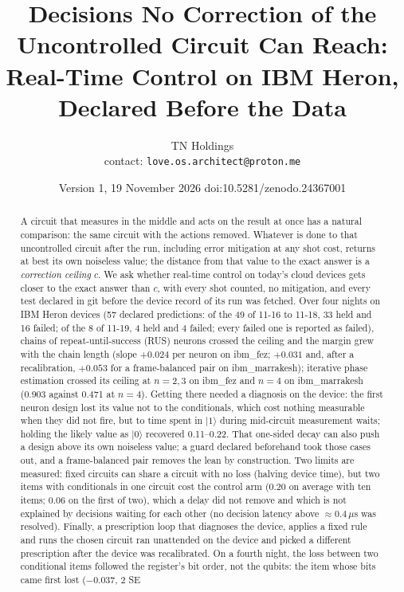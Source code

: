 \documentclass[10pt,a4paper]{article}
\title{Decisions No Correction of the Uncontrolled Circuit Can Reach:\\ Real-Time Control on IBM Heron, Declared
Before the Data}
\author{TN Holdings\\ \small contact: \texttt{love.os.architect@proton.me}}
\date{Version 1, 19 November 2026 \quad doi:10.5281/zenodo.24367001}
\begin{document}
\maketitle

\begin{abstract}
A circuit that measures in the middle and acts on the result at once has a natural comparison: the same circuit with
the actions removed. Whatever is done to that uncontrolled circuit after the run, including error mitigation at any
shot cost, returns at best its own noiseless value; the distance from that value to the exact answer is a
\emph{correction ceiling} $c$. We ask whether real-time control on today's cloud devices gets closer to the exact answer
than $c$, with every shot counted, no mitigation, and every test declared in git before the device record of its run
was fetched. Over four nights on IBM Heron devices (57 declared predictions: of the 49 of 11-16 to 11-18, 33 held and
16 failed; of the 8 of 11-19, 4 held and 4 failed; every failed one is reported as failed), chains of repeat-until-success (RUS) neurons crossed the ceiling and the margin grew with the chain length
(slope $+0.024$ per neuron on ibm\_fez; $+0.031$ and, after a recalibration, $+0.053$ for a frame-balanced pair on
ibm\_marrakesh); iterative phase estimation crossed its ceiling at $n=2,3$ on ibm\_fez and $n=4$ on ibm\_marrakesh
(0.903 against 0.471 at $n=4$). Getting
there needed a diagnosis on the device: the first neuron design lost its value not to the conditionals, which cost
nothing measurable when they did not fire, but to time spent in $|1\rangle$ during mid-circuit measurement waits;
holding the likely value as $|0\rangle$ recovered 0.11--0.22. That one-sided decay can also push a design above its own
noiseless value; a guard declared beforehand took those cases out, and a frame-balanced pair removes the lean by
construction. Two limits are measured: fixed circuits can share a circuit with no loss (halving device time), but two
items with conditionals in one circuit cost the control arm (0.20 on average with ten items; 0.06 on the first of two),
which a delay did not remove and which is not explained by decisions waiting for each other (no decision latency above $\approx0.4\,\mu$s was resolved). Finally, a
prescription loop that diagnoses the device, applies a fixed rule and runs the chosen circuit ran unattended on the
device and picked a different prescription after the device was recalibrated. On a fourth night, the loss between two
conditional items followed the register's bit order, not the qubits: the item whose bits came first lost ($-0.037$, 2 SE

\end{abstract}
\end{document}
